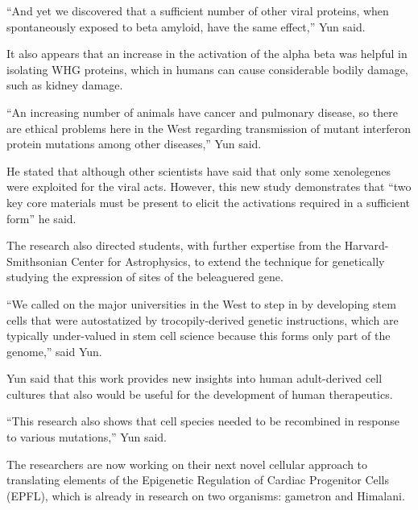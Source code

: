 \documentclass{article}
\begin{document}
“And yet we discovered that a sufficient number of other viral proteins, when spontaneously exposed to beta amyloid, have the same effect,” Yun said.

It also appears that an increase in the activation of the alpha beta was helpful in isolating WHG proteins, which in humans can cause considerable bodily damage, such as kidney damage.

“An increasing number of animals have cancer and pulmonary disease, so there are ethical problems here in the West regarding transmission of mutant interferon protein mutations among other diseases,” Yun said.

He stated that although other scientists have said that only some xenolegenes were exploited for the viral acts. However, this new study demonstrates that “two key core materials must be present to elicit the activations required in a sufficient form” he said.

The research also directed students, with further expertise from the Harvard-Smithsonian Center for Astrophysics, to extend the technique for genetically studying the expression of sites of the beleaguered gene.

“We called on the major universities in the West to step in by developing stem cells that were autostatized by trocopily-derived genetic instructions, which are typically under-valued in stem cell science because this forms only part of the genome,” said Yun.

Yun said that this work provides new insights into human adult-derived cell cultures that also would be useful for the development of human therapeutics.

“This research also shows that cell species needed to be recombined in response to various mutations,” Yun said.

The researchers are now working on their next novel cellular approach to translating elements of the Epigenetic Regulation of Cardiac Progenitor Cells (EPFL), which is already in research on two organisms: gametron and Himalani.
\end{document}
